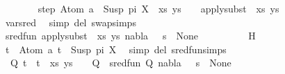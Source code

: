 \begin{isabellebody}
\ \ \ \ \ \ \isamarkupfalse%
\ step{\isacharcolon}{\kern0pt}\ {\isachardoublequoteopen}{\isacharparenleft}{\kern0pt}{\isacharparenleft}{\kern0pt}Atom\ a\ {\isasymapprox}{\isacharquery}{\kern0pt}\ Susp\ pi\ X{\isacharparenright}{\kern0pt}\ {\isacharhash}{\kern0pt}\ xs{\isacharcomma}{\kern0pt}\ ys{\isacharparenright}{\kern0pt}\ {\isasymturnstile}\ {\isacharquery}{\kern0pt}{\isasymsigma}\ {\isasymleadsto}\ apply{\isacharunderscore}{\kern0pt}subst\ {\isacharquery}{\kern0pt}{\isasymsigma}\ {\isacharparenleft}{\kern0pt}xs{\isacharcomma}{\kern0pt}\ ys{\isacharparenright}{\kern0pt}{\isachardoublequoteclose}\isanewline
\ \ \ \ \ \ \ \ \isamarkupfalse%
\ var{\isacharunderscore}{\kern0pt}{}{\isacharunderscore}{\kern0pt}sred\ \isamarkupfalse%
\ {\isacharparenleft}{\kern0pt}simp\ del{\isacharcolon}{\kern0pt}\ swap{\isachardot}{\kern0pt}simps{\isacharparenright}{\kern0pt}\isanewline
\ \ \ \ \ \ \isamarkupfalse%
\ {\isachardoublequoteopen}sred{\isacharunderscore}{\kern0pt}fun\ {\isacharparenleft}{\kern0pt}apply{\isacharunderscore}{\kern0pt}subst\ {\isacharquery}{\kern0pt}{\isasymsigma}\ {\isacharparenleft}{\kern0pt}xs{\isacharcomma}{\kern0pt}\ ys{\isacharparenright}{\kern0pt}{\isacharcomma}{\kern0pt}\ nabla{\isacharcomma}{\kern0pt}\ {\isacharquery}{\kern0pt}{\isasymsigma}\ {\isasymbullet}\ s{\isacharparenright}{\kern0pt}\ {\isacharequal}{\kern0pt}\ None{\isachardoublequoteclose}\isanewline
\ \ \ \ \ \ \ \ \isamarkupfalse%
\ H\ \isamarkupfalse%
\ {\isacartoucheopen}t{}\ {\isacharequal}{\kern0pt}\ Atom\ a{\isacartoucheclose}\ {\isacartoucheopen}t{}\ {\isacharequal}{\kern0pt}\ Susp\ pi\ X{\isacartoucheclose}\ \isamarkupfalse%
\ {\isacharparenleft}{\kern0pt}simp\ del{\isacharcolon}{\kern0pt}\ sred{\isacharunderscore}{\kern0pt}fun{\isachardot}{\kern0pt}simps{\isacharparenright}{\kern0pt}\isanewline
\ \ \ \ \ \ \isamarkupfalse%
\ \isamarkupfalse%
\ {\isachardoublequoteopen}{\isasymexists}{\isasymsigma}\ Q{\isachardot}{\kern0pt}\ {\isacharparenleft}{\kern0pt}{\isacharparenleft}{\kern0pt}t{}\ {\isasymapprox}{\isacharquery}{\kern0pt}\ t{}{\isacharparenright}{\kern0pt}\ {\isacharhash}{\kern0pt}\ xs{\isacharcomma}{\kern0pt}\ ys{\isacharparenright}{\kern0pt}\ {\isasymturnstile}\ {\isasymsigma}\ {\isasymleadsto}\ Q\ {\isasymand}\ sred{\isacharunderscore}{\kern0pt}fun\ {\isacharparenleft}{\kern0pt}Q{\isacharcomma}{\kern0pt}\ nabla{\isacharcomma}{\kern0pt}\ {\isasymsigma}\ {\isasymbullet}\ s{\isacharparenright}{\kern0pt}\ {\isacharequal}{\kern0pt}\ None{\isachardoublequoteclose}\isanewline

\end{isabellebody}
